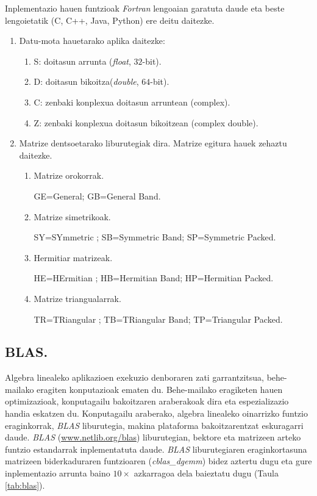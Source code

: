Inplementazio hauen funtzioak \emph{Fortran} lengoaian garatuta daude eta beste lengoietatik (C, C++, Java, Python) ere deitu daitezke. 
\begin{enumerate}
\item Datu-mota hauetarako aplika daitezke:

\begin{enumerate}
\item S: doitasun arrunta (\emph{float}, $32$-bit).
\item D: doitasun bikoitza(\emph{double}, $64$-bit).
\item C: zenbaki konplexua doitasun arruntean (complex).
\item Z: zenbaki konplexua doitasun bikoitzean (complex double).
\end{enumerate}  

\item Matrize dentsoetarako liburutegiak dira. Matrize egitura hauek zehaztu daitezke.
\begin{enumerate}
\item Matrize orokorrak.

 GE=General; GB=General Band.
\item Matrize simetrikoak.

 SY=SYmmetric ; SB=Symmetric Band; SP=Symmetric Packed.
\item Hermitiar matrizeak.

 HE=HErmitian ; HB=Hermitian Band; HP=Hermitian Packed.
\item Matrize triangualarrak.

 TR=TRiangular ; TB=TRiangular Band; TP=Triangular Packed.
\end{enumerate}

\end{enumerate}   

\subsection*{BLAS.}

Algebra linealeko aplikazioen exekuzio denboraren zati garrantzitsua, behe-mailako eragiten konputazioak ematen du. Behe-mailako eragiketen hauen optimizazioak, konputagailu bakoitzaren araberakoak dira eta espezializazio handia eskatzen du. Konputagailu araberako, algebra linealeko oinarrizko funtzio eraginkorrak, \emph{BLAS} liburutegia, makina plataforma bakoitzarentzat eskuragarri daude. \emph{BLAS} (\url{www.netlib.org/blas}) liburutegian, bektore eta matrizeen arteko funtzio estandarrak inplementatuta daude. \emph{BLAS} liburutegiaren eraginkortasuna matrizeen biderkaduraren funtzioaren  (\emph{cblas\_dgemm}) bidez aztertu dugu eta gure inplementazio arrunta baino $10\times$ azkarragoa dela baieztatu dugu (Taula \ref{tab:blas}). 

